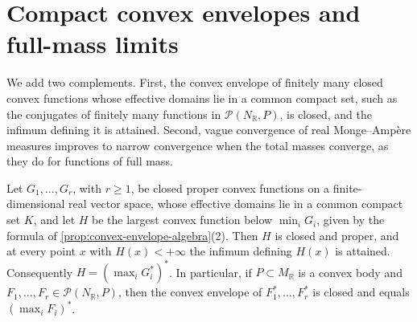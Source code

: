 \section{Compact convex envelopes and full-mass limits}
\label{sec:compact-convex-interfaces}
We add two complements. First, the convex envelope of finitely many closed convex functions whose effective domains lie in a common compact set, such as the conjugates of finitely many functions in $\mathcal P(N_{\mathbb R},P)$, is closed, and the infimum defining it is attained. Second, vague convergence of real Monge--Amp\`ere measures improves to narrow convergence when the total masses converge, as they do for functions of full mass.

\begin{lemma}\label{lem:compact-domain-finite-convex-envelope}
Let $G_1,\ldots,G_r$, with $r\geq1$, be closed proper convex functions on a finite-dimensional real vector space, whose effective domains lie in a common compact set $K$, and let $H$ be the largest convex function below $\min_iG_i$, given by the formula of \cref{prop:convex-envelope-algebra}(2). Then $H$ is closed and proper, and at every point $x$ with $H(x)<+\infty$ the infimum defining $H(x)$ is attained. Consequently $H=(\max_iG_i^*)^*$. In particular, if $P\subset M_{\mathbb R}$ is a convex body and $F_1,\ldots,F_r\in\mathcal P(N_{\mathbb R},P)$, then the convex envelope of $F_1^*,\ldots,F_r^*$ is closed and equals $(\max_iF_i)^*$.
\end{lemma}
